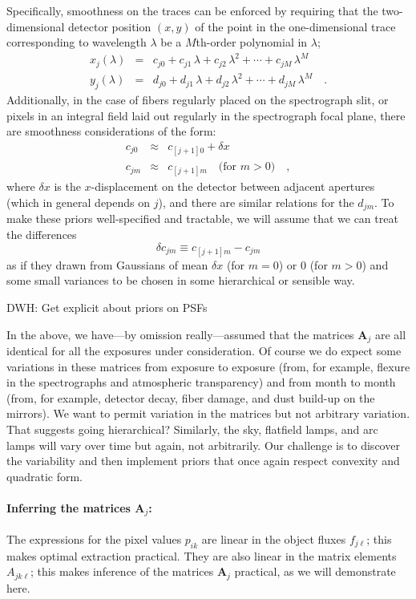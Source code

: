 \documentclass[12pt]{article}
\newcommand{\hmatrix}[1]{\boldsymbol{#1}}
\newcommand{\Amatrix}{\hmatrix{A}}
\begin{document}
Specifically, smoothness on the traces can be enforced by requiring
that the two-dimensional detector position $(x,y)$ of the point in the
one-dimensional trace corresponding to wavelength $\lambda$ be a
$M$th-order polynomial in $\lambda$;
\begin{eqnarray}\displaystyle
x_j(\lambda) & = & c_{j0} + c_{j1}\,\lambda + c_{j2}\,\lambda^2 + \cdots + c_{jM}\,\lambda^M \\
y_j(\lambda) & = & d_{j0} + d_{j1}\,\lambda + d_{j2}\,\lambda^2 + \cdots + d_{j
M}\,\lambda^M \quad .
\end{eqnarray}
Additionally, in the case of fibers regularly placed on the
spectrograph slit, or pixels in an integral field laid out regularly
in the spectrograph focal plane, there are smoothness considerations
of the form:
\begin{eqnarray}\displaystyle
c_{j0} & \approx & c_{[j+1]0} + \delta x \\
c_{jm} & \approx & c_{[j+1]m} \quad \mbox{(for $m > 0$)} \quad ,
\end{eqnarray}
where $\delta x$ is the $x$-displacement on the detector between
adjacent apertures (which in general depends on $j$), and there are
similar relations for the $d_{jm}$.  To make these priors
well-specified and tractable, we will assume that we can treat the
differences
\begin{equation}
\delta c_{jm} \equiv c_{[j+1]m} - c_{jm}
\end{equation}
as if they drawn from Gaussians of mean $\delta x$ (for $m=0$) or $0$
(for $m>0$) and some small variances to be chosen in some hierarchical
or sensible way.

DWH: Get explicit about priors on PSFs

In the above, we have---by omission really---assumed that the matrices
$\Amatrix_j$ are all identical for all the exposures under
consideration.  Of course we do expect some variations in these
matrices from exposure to exposure (from, for example, flexure in the
spectrographs and atmospheric transparency) and from month to month
(from, for example, detector decay, fiber damage, and dust build-up on
the mirrors).  We want to permit variation in the matrices but not
arbitrary variation.  That suggests going hierarchical?  Similarly,
the sky, flatfield lamps, and arc lamps will vary over time but again,
not arbitrarily.  Our challenge is to discover the variability and
then implement priors that once again respect convexity and quadratic
form.

\paragraph{Inferring the matrices $\Amatrix_j$:}
The expressions for the pixel values $p_{ik}$ are linear in the object
fluxes $f_{j\ell}$; this makes optimal extraction practical.  They are
also linear in the matrix elements $A_{jk\ell}$; this makes inference
of the matrices $\Amatrix_j$ practical, as we will demonstrate here.
\end{document}
